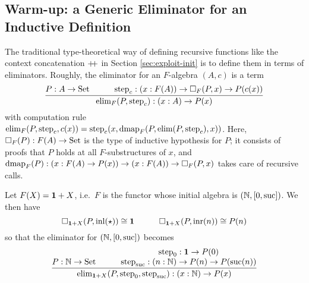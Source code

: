 \documentclass[orivec,envcountsame, ,envcountsect]{llncs}
\begin{document}
\subsection{Warm-up: a Generic Eliminator for an Inductive Definition}
\label{sec:elim-ind-intro}

The traditional type-theoretical way of defining recursive functions
like the context concatenation $\mathbin{+\mkern-6mu+}$ in Section
\ref{sec:exploit-init} is to define them in terms of eliminators.
Roughly, the eliminator for an $F$-algebra $(A, c)$ is a term %
\[
\infer{\elim_F(P, \stepind{c}) : (x : A) \to P(x)}
      {P : A \to \Set & \qquad
       \stepind{c} : (x : F(A)) \to \BOX_F(P, x) \to P(c(x))}
\]
with computation rule $\text{elim}_F(P, \text{step}_{c}, c(x)) = \text{step}_{c}(x, \text{dmap}_F(P,
\text{elim}(P, \text{step}_{c}), x))$. Here, $\Box_F(P) : F(A) \to \text{Set}$ is the type of
inductive hypothesis for $P$; it consists of proofs that $P$ holds at
all $F$-substructures of $x$, and $\text{dmap}_F(P) : (x : F(A) \to P(x)) \to (x :
F(A)) \to \Box_F(P, x)$ takes care of recursive calls.

\begin{example}
\label{ex:natexample}
  Let $F(X) = \mathbf{1} + X$, i.e.\ $F$ is the functor whose initial
  algebra is $(\mathbb{N}, [0, \text{suc}])$.  We then have
\[ %
  \BOX_{\one + X}(P, \inl(\oneelt)) \cong \one \qquad\quad
  \BOX_{\one + X}(P, \inr(n)) \cong P(n)
\] %
so that the eliminator for $(\mathbb{N}, [0, \text{suc}])$ becomes
\[
\infer{\elim_{\one + X}(P, \stepind{0}, \stepind{\suc}) : (x : \Nat) \to P(x)}
      {P : \Nat \to \Set & \qquad 
       \deduce{\stepind{\suc} : (n : \Nat) \to P(n) \to P(\suc(n))}{\stepind{0} : \one \to P(0)}}
\]
\end{example}
\end{document}
